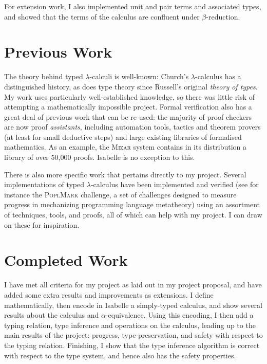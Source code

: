 For extension work, I also implemented unit and pair terms and associated types, and showed that the terms of the calculus are confluent under \(\beta\)-reduction.

\section{Previous Work}
The theory behind typed \(\lambda\)-calculi is well-known: Church's \(\lambda\)-calculus has a distinguished history\cite{lambda-history}, as does type theory since Russell's original \emph{theory of types}\cite{russell}.
My work uses particularly well-established knowledge, so there was little risk of attempting a mathematically impossible project.
Formal verification also has a great deal of previous work that can be re-used: the majority of proof checkers are now proof \emph{assistants}, including automation tools, tactics and theorem provers (at least for small deductive steps) and large existing libraries of formalised mathematics.
As an example, the \textsc{Mizar} system\cite{mizar} contains in its distribution a library of over 50,000 proofs.
Isabelle is no exception to this.

There is also more specific work that pertains directly to my project.
Several implementations of typed \(\lambda\)-calculus have been implemented and verified (see for instance the \textsc{PoplMark} challenge\cite{poplmark}, a set of challenges designed to measure progress in mechanizing programming language metatheory) using an assortment of techniques, tools, and proofs, all of which can help with my project.
I can draw on these for inspiration.

\section{Completed Work}
I have met all criteria for my project as laid out in my project proposal, and have added some extra results and improvements as extensions.
I define mathematically, then encode in Isabelle a simply-typed calculus, and show several results about the calculus and \(\alpha\)-equivalence.
Using this encoding, I then add a typing relation, type inference and operations on the calculus, leading up to the main results of the project: progress, type-preservation, and safety with respect to the typing relation.
Finishing, I show that the type inference algorithm is correct with respect to the type system, and hence also has the safety properties.
